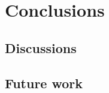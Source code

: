 \chapter{Conclusions}
\label{conclusions}
\linenumbers

\section{Discussions}
\label{sec:7_discussion}

\section{Future work}
\label{sec:7_futurework}

\vfill
\nolinenumbers